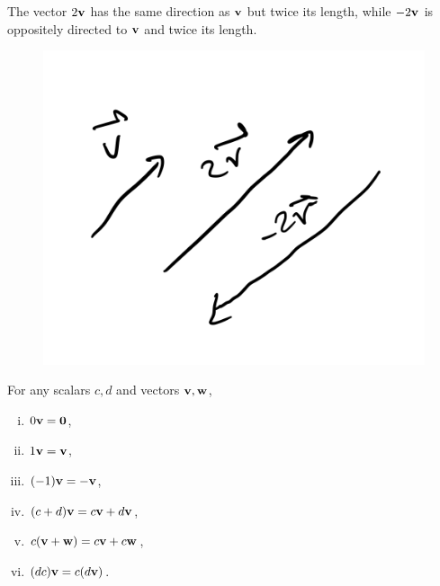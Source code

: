 \documentclass[12pt,letterpaper,reqno]{article}
\numberwithin{equation}{section}
\begin{document}
\begin{example}
The vector $2{\bf v}$ has the same direction as ${\bf v}$ but twice its length, while $-2{\bf v}$ is oppositely directed to ${\bf v}$ and twice its length. 

\begin{figure}[h]
	\begin{center}
	\includegraphics[scale=0.4]{figures_mvc/v2v}
\end{center}
\end{figure}
\end{example}
\newpage
\begin{thm}\label{thm:properties_of_scalar_multiplication}
For any scalars $c,d$ and vectors ${\bf v}, {\bf w}$, 
	\begin{enumerate}[(i)]
		\item $0{\bf v}={\bf 0}$,
		\item $1{\bf v}={\bf v}$,
		\item $(-1){\bf v}=-{\bf v}$,
		\item $(c+d){\bf v}=c{\bf v}+d{\bf v}$,
		\item $c({\bf v}+{\bf w})=c{\bf v}+c{\bf w}$,
		\item $(dc){\bf v}=c(d{\bf v})$.
	\end{enumerate}
\end{thm}
\end{document}
